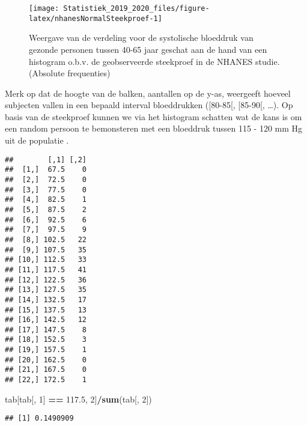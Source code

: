 \documentclass[12pt,dutch,coursenotes]{book}
\newenvironment{Shaded}{\begin{snugshade}}{\end{snugshade}}
\newcommand{\KeywordTok}[1]{\textcolor[rgb]{0.13,0.29,0.53}{\textbf{#1}}}
\newcommand{\DecValTok}[1]{\textcolor[rgb]{0.00,0.00,0.81}{#1}}
\newcommand{\FloatTok}[1]{\textcolor[rgb]{0.00,0.00,0.81}{#1}}
\newcommand{\StringTok}[1]{\textcolor[rgb]{0.31,0.60,0.02}{#1}}
\newcommand{\OperatorTok}[1]{\textcolor[rgb]{0.81,0.36,0.00}{\textbf{#1}}}
\newcommand{\NormalTok}[1]{#1}
\theoremstyle{definition}
\theoremstyle{definition}
\theoremstyle{definition}
\theoremstyle{remark}
\begin{document}
\begin{figure}

{\centering \texttt{[image: Statistiek\_2019\_2020\_files/figure-latex/nhanesNormalSteekproef-1]} 

}

\caption{Weergave van de verdeling voor de systolische bloeddruk van gezonde personen tussen 40-65 jaar geschat aan de hand van een histogram o.b.v. de geobserveerde steekproef in de NHANES studie. (Absolute frequenties)}\label{fig:nhanesNormalSteekproef}
\end{figure}

Merk op dat de hoogte van de balken, aantallen op de y-as, weergeeft
hoeveel subjecten vallen in een bepaald interval bloeddrukken
({[}80-85{[}, {[}85-90{[}, \ldots{}). Op basis van de steekproef kunnen
we via het histogram schatten wat de kans is om een random persoon te
bemonsteren met een bloeddruk tussen 115 - 120 mm Hg uit de populatie .

\begin{Shaded}
\end{Shaded}

\begin{verbatim}
##        [,1] [,2]
##  [1,]  67.5    0
##  [2,]  72.5    0
##  [3,]  77.5    0
##  [4,]  82.5    1
##  [5,]  87.5    2
##  [6,]  92.5    6
##  [7,]  97.5    9
##  [8,] 102.5   22
##  [9,] 107.5   35
## [10,] 112.5   33
## [11,] 117.5   41
## [12,] 122.5   36
## [13,] 127.5   35
## [14,] 132.5   17
## [15,] 137.5   13
## [16,] 142.5   12
## [17,] 147.5    8
## [18,] 152.5    3
## [19,] 157.5    1
## [20,] 162.5    0
## [21,] 167.5    0
## [22,] 172.5    1
\end{verbatim}

\begin{Shaded}
\begin{Highlighting}[]
\NormalTok{tab[tab[, }\DecValTok{1}\NormalTok{] }\OperatorTok{==}\StringTok{ }\FloatTok{117.5}\NormalTok{, }\DecValTok{2}\NormalTok{]}\OperatorTok{/}\KeywordTok{sum}\NormalTok{(tab[, }\DecValTok{2}\NormalTok{])}
\end{Highlighting}
\end{Shaded}

\begin{verbatim}
## [1] 0.1490909
\end{verbatim}
\end{document}
